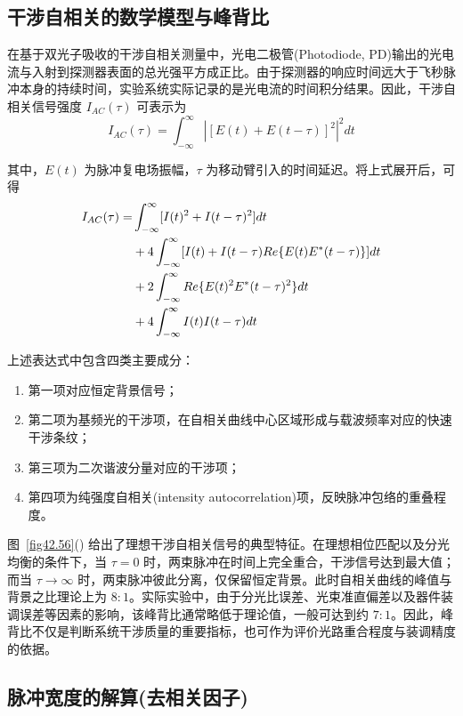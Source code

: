 {\subsection{干涉自相关的数学模型与峰背比}\label{app:auto_math}

在基于双光子吸收的干涉自相关测量中，光电二极管(Photodiode, PD)输出的光电流与入射到探测器表面的总光强平方成正比。由于探测器的响应时间远大于飞秒脉冲本身的持续时间，实验系统实际记录的是光电流的时间积分结果。因此，干涉自相关信号强度 $I_{AC}(\tau)$ 可表示为
\begin{equation}
    I_{AC}(\tau)=\int_{-\infty}^{\infty}|[E(t)+E(t-\tau)]^{2}|^{2}dt
\end{equation}

其中，$E(t)$ 为脉冲复电场振幅，$\tau$ 为移动臂引入的时间延迟。将上式展开后，可得
\begin{align}
    I_{AC}(\tau)=&\int_{-\infty}^{\infty}[I(t)^{2}+I(t-\tau)^{2}]dt\\ \notag
    &+4\int_{-\infty}^{\infty}[I(t)+I(t-\tau)Re\{E(t)E^{*}(t-\tau)\}]dt\\ \notag
    &+2\int_{-\infty}^{\infty}Re\{E(t)^{2}E^{*}(t-\tau)^{2}\}dt\\ \notag
    &+4\int_{-\infty}^{\infty}I(t)I(t-\tau)dt
\end{align}

上述表达式中包含四类主要成分：
\begin{enumerate}
    \item 第一项对应恒定背景信号；
    \item 第二项为基频光的干涉项，在自相关曲线中心区域形成与载波频率对应的快速干涉条纹；
    \item 第三项为二次谐波分量对应的干涉项；
    \item 第四项为纯强度自相关(intensity autocorrelation)项，反映脉冲包络的重叠程度。
\end{enumerate}

图~\ref{fig42.56}() 给出了理想干涉自相关信号的典型特征。在理想相位匹配以及分光均衡的条件下，当 $\tau=0$ 时，两束脉冲在时间上完全重合，干涉信号达到最大值；而当 $\tau \rightarrow \infty$ 时，两束脉冲彼此分离，仅保留恒定背景。此时自相关曲线的峰值与背景之比理论上为 $8:1$。实际实验中，由于分光比误差、光束准直偏差以及器件装调误差等因素的影响，该峰背比通常略低于理论值，一般可达到约 $7:1$。因此，峰背比不仅是判断系统干涉质量的重要指标，也可作为评价光路重合程度与装调精度的依据。


\subsection{脉冲宽度的解算(去相关因子)}\label{app:auto_deconv}

}

